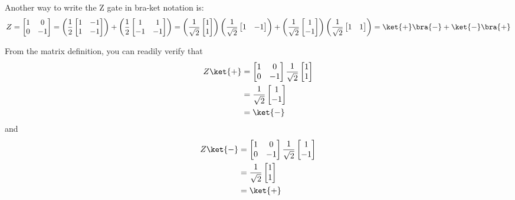 \documentclass{article}
\theoremstyle{definition}
\newcommand{\kx}[1]{\ket{#1}}
\newcommand{\bx}[1]{\bra{#1}}
\begin{document}
Another way to write the Z gate in bra-ket notation is:
\begin{equation}
	Z = \begin{bmatrix}
		1 & 0\\
		0 & -1
	\end{bmatrix} = \left(\frac{1}{2}\begin{bmatrix}
		1 & -1\\
		1 & -1
	\end{bmatrix}\right) + \left(\frac{1}{2}\begin{bmatrix}
		1 & 1\\
		-1 & -1
	\end{bmatrix}\right) = \left(\frac{1}{\sqrt{2}}\begin{bmatrix}
		1\\
		1
	\end{bmatrix}\right) \left(\frac{1}{\sqrt{2}}\begin{bmatrix}
		1 & -1
	\end{bmatrix}\right) + \left(\frac{1}{\sqrt{2}}\begin{bmatrix}
		1\\
		-1
	\end{bmatrix}\right) \left(\frac{1}{\sqrt{2}}\begin{bmatrix}
		1 & 1
	\end{bmatrix}\right) = \kx+ \bx- + \kx- \bx+
\end{equation}

From the matrix definition, you can readily verify that
\begin{align}
	Z \kx+ &= \begin{bmatrix}
		1 & 0\\
		0 & -1
	\end{bmatrix} \frac{1}{\sqrt{2}}\begin{bmatrix}
		1\\
		1
	\end{bmatrix}\\
	&= \frac{1}{\sqrt{2}}\begin{bmatrix}
		1\\
		-1
	\end{bmatrix}\\
	&= \kx-
\end{align}
and
\begin{align}
	Z \kx- &= \begin{bmatrix}
		1 & 0\\
		0 & -1
	\end{bmatrix} \frac{1}{\sqrt{2}}\begin{bmatrix}
		1\\
		-1
	\end{bmatrix}\\
	&= \frac{1}{\sqrt{2}}\begin{bmatrix}
		1\\
		1
	\end{bmatrix}\\
	&= \kx+
\end{align}
\end{document}
